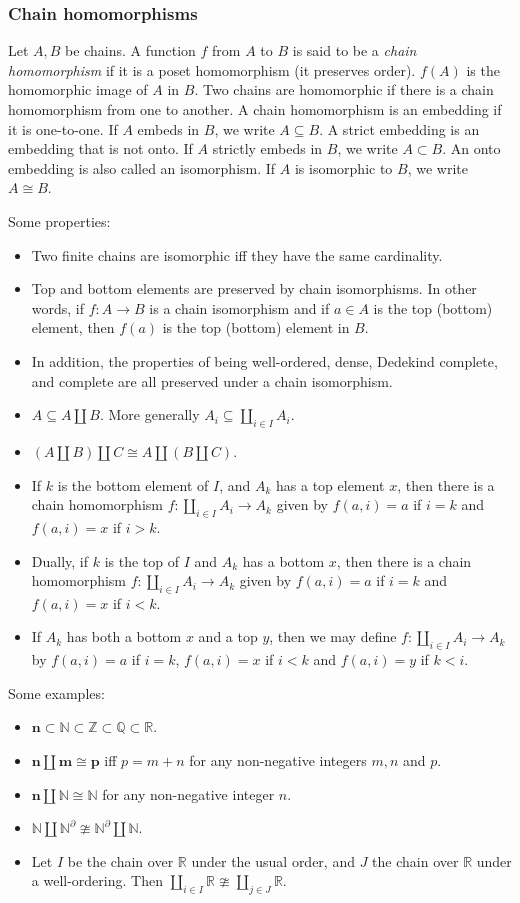 \documentclass{article}
\begin{document}
\subsubsection*{Chain homomorphisms}

Let $A,B$ be chains.  A function $f$ from $A$ to $B$ is said to be a \emph{chain homomorphism} if it is a poset homomorphism (it preserves order).  $f(A)$ is the homomorphic image of $A$ in $B$.  Two chains are homomorphic if there is a chain homomorphism from one to another.  A chain homomorphism is an embedding if it is one-to-one.  If $A$ embeds in $B$, we write $A\subseteq B$.  A strict embedding is an embedding that is not onto.  If $A$ strictly embeds in $B$, we write $A\subset B$.  An onto embedding is also called an isomorphism.  If $A$ is isomorphic to $B$, we write $A\cong B$.

Some properties:
\begin{itemize}
\item Two finite chains are isomorphic iff they have the same cardinality.
\item Top and bottom elements are preserved by chain isomorphisms.  In other words, if $f:A\to B$ is a chain isomorphism and if $a\in A$ is the top (bottom) element, then $f(a)$ is the top (bottom) element in $B$.
\item In addition, the properties of being well-ordered, dense, Dedekind complete, and complete are all preserved under a chain isomorphism.
\item $A\subseteq A\coprod B$.  More generally $A_i\subseteq \coprod_{i\in I} A_i$.
\item $(A\coprod B)\coprod C\cong A\coprod (B\coprod C)$.
\item If $k$ is the bottom element of $I$, and $A_k$ has a top element $x$, then there is a chain homomorphism $f:\coprod_{i\in I} A_i\to A_k$ given by $f(a,i)=a$ if $i=k$ and $f(a,i)=x$ if $i>k$.
\item Dually, if $k$ is the top of $I$ and $A_k$ has a bottom $x$, then there is a chain homomorphism $f:\coprod_{i\in I} A_i\to A_k$ given by $f(a,i)=a$ if $i=k$ and $f(a,i)=x$ if $i<k$.
\item If $A_k$ has both a bottom $x$ and a top $y$, then we may define $f:\coprod_{i\in I} A_i\to A_k$ by $f(a,i)=a$ if $i=k$, $f(a,i)=x$ if $i<k$ and $f(a,i)=y$ if $k<i$.
\end{itemize}

Some examples:
\begin{itemize}
\item $\mathbf{n}\subset \mathbb{N}\subset \mathbb{Z}\subset \mathbb{Q}\subset \mathbb{R}$.
\item $\mathbf{n}\coprod \mathbf{m}\cong \mathbf{p}$ iff $p=m+n$ for any non-negative integers $m,n$ and $p$.
\item $\mathbf{n}\coprod \mathbb{N}\cong \mathbb{N}$ for any non-negative integer $n$.
\item $\mathbb{N}\coprod \mathbb{N}^{\partial}\ncong \mathbb{N}^{\partial}\coprod\mathbb{N}$.
\item Let $I$ be the chain over $\mathbb{R}$ under the usual order, and $J$ the chain over $\mathbb{R}$ under a well-ordering.  Then $\coprod_{i\in I}\mathbb{R}\ncong \coprod_{j\in J}\mathbb{R}$.
\end{itemize}
\end{document}
